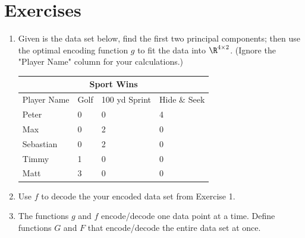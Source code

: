 \section{Exercises}
\begin{enumerate}
    \item Given is the data set below, find the first two principal components; then use the optimal encoding function $g$ to fit the data into $\R^{4 \times 2}$.  (Ignore the "Player Name" column for your calculations.)

\begin{table}[H]
\centering
\begin{tabular}{ |p{2cm}||p{2cm}|p{2cm}||p{2cm}|  }
    \hline
    \multicolumn{4}{|c|}{Sport Wins} \\
    \hline
    Player Name & Golf & 100 yd Sprint & Hide $\&$ Seek\\
    \hline
    Peter       & 0 & 0 & 4\\
    Max         & 0 & 2 & 0\\
    Sebastian   & 0 & 2 & 0\\
    Timmy       & 1 & 0 & 0\\
    Matt        & 3 & 0 & 0\\
    \hline
\end{tabular}
\end{table}
    \item Use $f$ to decode the your encoded data set from Exercise 1.
    \item The functions $g$ and $f$ encode/decode one data point at a time.  Define functions $G$ and $F$ that encode/decode the entire data set at once.
\end{enumerate}

